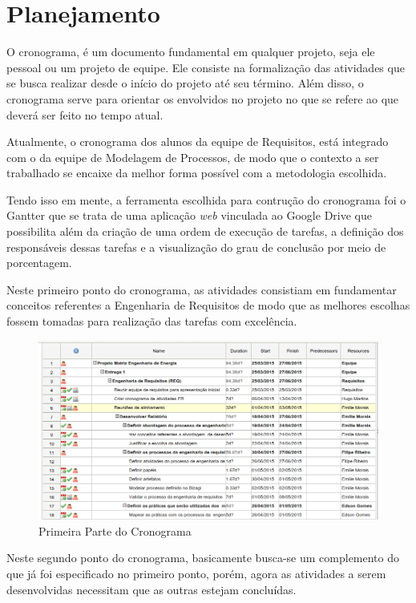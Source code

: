 \chapter[Planejamento]{Planejamento}
O cronograma, é um documento fundamental em qualquer projeto, seja ele pessoal ou um projeto de equipe. Ele consiste na formalização das atividades que se busca realizar desde o início do projeto até seu término. Além disso, o cronograma serve para orientar os envolvidos no projeto no que se refere ao que deverá ser feito no tempo atual.

Atualmente, o cronograma dos alunos da equipe de Requisitos, está integrado com o da equipe de Modelagem de Processos, de modo que o contexto a ser trabalhado se encaixe da melhor forma possível com a metodologia escolhida.

Tendo isso em mente, a ferramenta escolhida para contrução do cronograma foi o Gantter que se trata de uma aplicação \textit{web} vinculada ao Google Drive que possibilita
além da criação de uma ordem de execução de tarefas, a definição dos responsáveis dessas tarefas e a visualização do grau de conclusão por meio de porcentagem.

Neste primeiro ponto do cronograma, as atividades consistiam em fundamentar conceitos referentes a Engenharia de Requisitos de modo que as melhores escolhas fossem tomadas para realização das tarefas com excelência.

\begin{figure}[!htb]
\centering
\includegraphics[scale=0.55]{figuras/cronograma1.png}
\caption{Primeira Parte do Cronograma}
\end{figure}

Neste segundo ponto do cronograma, basicamente busca-se um complemento do que já foi especificado no primeiro ponto, porém, agora as atividades a serem desenvolvidas necessitam que as outras estejam concluídas.

